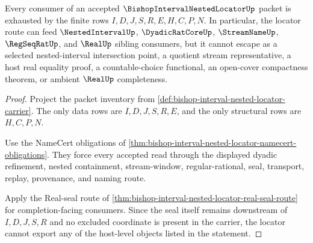 \begin{theorem}
\label{thm:bishop-interval-nested-locator-nonescape}
Every consumer of an accepted $\BishopIntervalNestedLocatorUp$ packet is exhausted by the finite rows $I,D,J,S,R,E,H,C,P,N$. In particular, the locator route can feed $\NestedIntervalUp$, $\DyadicRatCoreUp$, $\StreamNameUp$, $\RegSeqRatUp$, and $\RealUp$ sibling consumers, but it cannot escape as a selected nested-interval intersection point, a quotient stream representative, a host real equality proof, a countable-choice functional, an open-cover compactness theorem, or ambient $\RealUp$ completeness.
\end{theorem}
\begin{proof}
Project the packet inventory from \autoref{def:bishop-interval-nested-locator-carrier}. The only data rows are $I,D,J,S,R,E$, and the only structural rows are $H,C,P,N$.

Use the NameCert obligations of \autoref{thm:bishop-interval-nested-locator-namecert-obligations}. They force every accepted read through the displayed dyadic refinement, nested containment, stream-window, regular-rational, seal, transport, replay, provenance, and naming route.

Apply the Real-seal route of \autoref{thm:bishop-interval-nested-locator-real-seal-route} for completion-facing consumers. Since the seal itself remains downstream of $I,D,J,S,R$ and no excluded coordinate is present in the carrier, the locator cannot export any of the host-level objects listed in the statement.
\end{proof}

\begin{closurestatus}{\BishopIntervalNestedLocatorUp}
  \theoryclosure{\seedClosure}
  \formalstatus{\unformalizedV}
\end{closurestatus}

